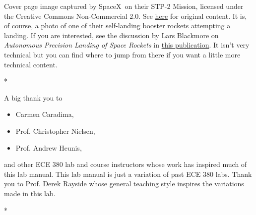 \documentclass[letterpaper, 12pt, oneside]{memoir}
\begin{document}
\noindent
Cover page image captured by SpaceX\textregistered~on their
STP-2 Mission, licensed under the Creative Commons Non-Commercial 2.0. See
\href{https://www.flickr.com/photos/spacex/48129269942/}{here}
for original content. It is, of course, a photo of one of their self-landing
booster rockets attempting a landing. If you are interested, see the discussion
by Lars Blackmore on \emph{Autonomous Precision Landing of Space Rockets}
in
\href{http://www.larsblackmore.com/nae_bridge_2016.pdf}{this publication}. It
isn't very technical but you can find where to jump from there if you want a
little more technical content.
\begin{center}
  * \qquad * \qquad *
\end{center}
\noindent
A big thank you to
\begin{itemize}[label={}]
  \item{Carmen Caradima,}
  \item{Prof. Christopher Nielsen,}
  \item{Prof. Andrew Heunis,}
\end{itemize}
and other ECE 380 lab and course instructors whose work has inspired much
of this lab manual. This lab manual is just a variation of past
ECE 380 labs. Thank you to Prof. Derek Rayside whose general teaching
style inspires the variations made in this lab.
\begin{center}
  * \qquad * \qquad *
\end{center}

\pagebreak

\frontmatter

\tableofcontents*
\thispagestyle{empty}

\clearpage
\listoffigures*

\clearpage
\listoftables*

%


\mainmatter







\appendix



\backmatter
\end{document}
